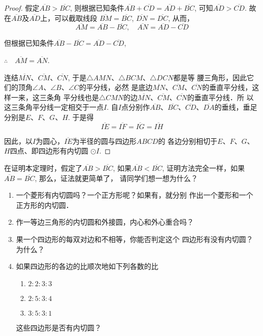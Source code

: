 \begin{proof}
    假定$\overline{AB}>\overline{BC}$, 则根据已知条件$\overline{AB}+\overline{CD}=\overline{AD}+
    \overline{BC}$, 可知$\overline{AD}>\overline{CD}$. 故在$\overline{AB}$及$\overline{AD}$上，可以截取线段
    $\overline{BM}=\overline{BC}$, $\overline{DN}=\overline{DC}$, 从而，
\[\overline{AM}=\overline{AB}-\overline{BC},\quad \overline{AN}=\overline{AD}-\overline{CD}\]

但根据已知条件$\overline{AB}-\overline{BC}=\overline{AD}-\overline{CD}$, 

$\therefore\quad \overline{AM}=\overline{AN}$.

连结$\overline{MN}$、$\overline{CM}$、$\overline{CN}$, 于是$\triangle AMN$、$\triangle BCM$、$\triangle DCN$都是等
腰三角形，因此它们的顶角$\angle A$、$\angle B$、$\angle C$的平分线，必然
是底边$\overline{MN}$、$\overline{CM}$、$\overline{CN}$的垂直平分线，这样一来，这三条角
平分线也是$\triangle CMN$的边$\overline{MN}$、$\overline{CM}$、$\overline{CN}$的垂直平分线．所
以这三条角平分线一定相交于一点$I$. 自$I$点分别作$\overline{AB}$、$\overline{BC}$、$\overline{CD}$、$\overline{DA}$的垂线，垂足分别是$E$、$F$、$G$、$H$. 于是得
\[\overline{IE}=\overline{IF}=\overline{IG}=\overline{IH}\]

因此，以$I$为圆心，$\overline{IE}$为半径的圆与四边形$ABCD$的
各边分别相切于$E$、$F$、$G$、$H$四点、即四边形有内切圆
$\odot I$. 
\end{proof}

\begin{rmk}
    在证明本定理时，假定了$\overline{AB}>\overline{BC}$, 如果$\overline{AB}<\overline{BC}$, 
证明方法完全一样，如果$\overline{AB}=\overline{BC}$, 那么，证法就更简单了，
请同学们想一想为什么？
\end{rmk}

\begin{ex}
\begin{enumerate}
    \item 一个菱形有内切圆吗？一个正方形呢？如果有，就分别
    作出一个菱形和一个正方形的内切圆．
    \item 作一等边三角形的内切圆和外接圆，内心和外心重合吗？
    \item 果一个四边形的每双对边和不相等，你能否判定这个
    四边形有没有内切圆？为什么？
    \item 如果四边形的各边的比顺次地如下列各数的比
\begin{multicols}{3}
\begin{enumerate}
    \item $2:2:3:3$
    \item $2:5:3:4$
    \item $3:5:3:1$
\end{enumerate}
\end{multicols}
这些四边形是否有内切圆？
\end{enumerate}
\end{ex}

